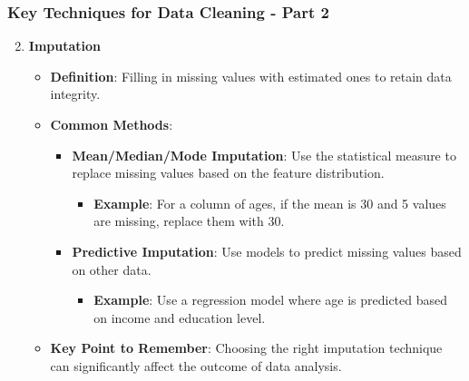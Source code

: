 \documentclass[aspectratio=169]{beamer}
\begin{document}
\begin{frame}[fragile]
    \frametitle{Key Techniques for Data Cleaning - Part 2}
    \begin{enumerate}
        \setcounter{enumi}{1}
        \item \textbf{Imputation}
        \begin{itemize}
            \item \textbf{Definition}: Filling in missing values with estimated ones to retain data integrity.
            \item \textbf{Common Methods}:
            \begin{itemize}
                \item \textbf{Mean/Median/Mode Imputation}: Use the statistical measure to replace missing values based on the feature distribution.
                \begin{itemize}
                    \item \textbf{Example}: For a column of ages, if the mean is 30 and 5 values are missing, replace them with 30.
                \end{itemize}
                \item \textbf{Predictive Imputation}: Use models to predict missing values based on other data.
                \begin{itemize}
                    \item \textbf{Example}: Use a regression model where age is predicted based on income and education level.
                \end{itemize}
            \end{itemize}
            \item \textbf{Key Point to Remember}: Choosing the right imputation technique can significantly affect the outcome of data analysis.
        \end{itemize}
    \end{enumerate}
\end{frame}
\end{document}

